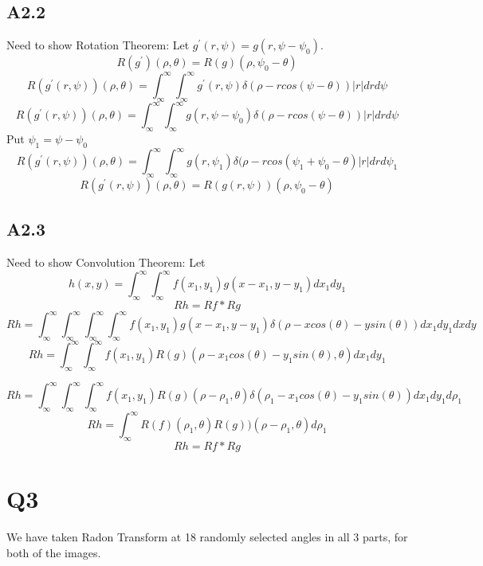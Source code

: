 \documentclass{article}
\newcommand{\dbint}{
  \int_{\infty}^{\infty}\int_{\infty}^{\infty}
}
\begin{document}
\subsection*{A2.2}
Need to show Rotation Theorem:
Let $g^{'}(r,\psi) = g(r,\psi - \psi_0). $
\begin{equation}
  \label{eq:2}
  R(g^{'})(\rho,\theta) = R(g)(\rho,\psi_0 - \theta)
\end{equation}
$$R(g^{'}(r,\psi))(\rho,\theta) = \dbint g^{'}(r,\psi)\delta(\rho - rcos(\psi - \theta))|r|drd\psi$$
$$R(g^{'}(r,\psi))(\rho,\theta) = \dbint g(r,\psi - \psi_0)\delta(\rho - rcos(\psi - \theta))|r|drd\psi$$
Put $\psi_1 = \psi - \psi_0$
$$R(g^{'}(r,\psi))(\rho,\theta) = \dbint g(r,\psi_1)\delta(\rho - rcos(\psi_1 + \psi_0 - \theta)|r|drd\psi_1$$
$$R(g^{'}(r,\psi))(\rho,\theta) = R(g(r,\psi))(\rho,\psi_0 - \theta)$$

\subsection*{A2.3}
Need to show Convolution Theorem:
Let $$h(x,y) = \dbint f(x_1,y_1)g(x - x_1,y - y_1)dx_1dy_1$$
\begin{equation}
  \label{eq:3}
  Rh = Rf * Rg
\end{equation}
$$Rh = \dbint\dbint f(x_1,y_1)g(x-x_1,y-y_1)\delta(\rho - xcos(\theta) - ysin(\theta))dx_1dy_1dxdy$$
$$Rh = \dbint f(x_1,y_1)R(g)(\rho - x_1cos(\theta) - y_1sin(\theta),\theta) dx_1dy_1$$

$$Rh = \dbint \int_{\infty}^{\infty}f(x_1,y_1)R(g)(\rho-\rho_1,\theta)\delta(\rho_1 - x_1cos(\theta) - y_1sin(\theta))dx_1dy_1d\rho_1$$
$$Rh = \int_{\infty}^{\infty}R(f)(\rho_1,\theta)R(g))(\rho - \rho_1,\theta)d\rho_1$$
$$Rh = Rf * Rg$$

\section*{Q3}
We have taken Radon Transform at 18 randomly selected angles in all 3 parts, for both of the images.
\end{document}
